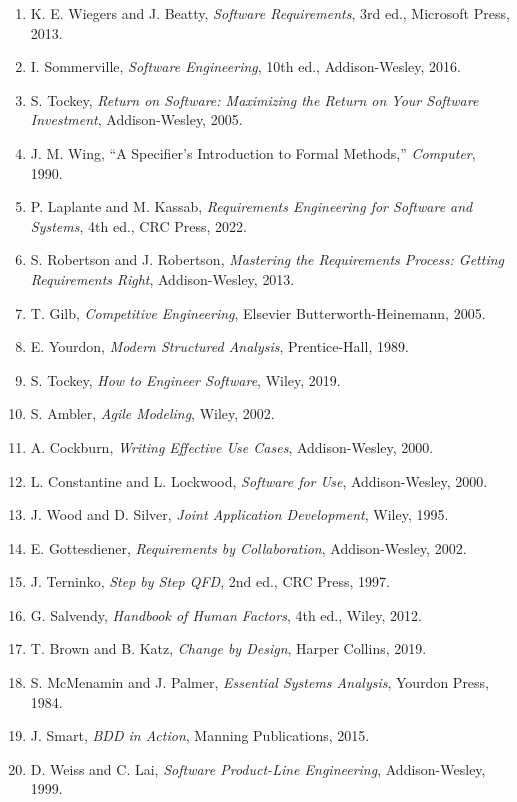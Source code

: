 \documentclass[uplatex,10pt,dvipdfmx,nomag]{jsarticle}
\begin{document}
\footnotesize
\begin{enumerate}[leftmargin=2.2em,itemsep=.15ex]
\item K. E. Wiegers and J. Beatty, \textit{Software Requirements}, 3rd ed., Microsoft Press, 2013.
\item I. Sommerville, \textit{Software Engineering}, 10th ed., Addison-Wesley, 2016.
\item S. Tockey, \textit{Return on Software: Maximizing the Return on Your Software Investment}, Addison-Wesley, 2005.
\item J. M. Wing, ``A Specifier's Introduction to Formal Methods,'' \textit{Computer}, 1990.
\item P. Laplante and M. Kassab, \textit{Requirements Engineering for Software and Systems}, 4th ed., CRC Press, 2022.
\item S. Robertson and J. Robertson, \textit{Mastering the Requirements Process: Getting Requirements Right}, Addison-Wesley, 2013.
\item T. Gilb, \textit{Competitive Engineering}, Elsevier Butterworth-Heinemann, 2005.
\item E. Yourdon, \textit{Modern Structured Analysis}, Prentice-Hall, 1989.
\item S. Tockey, \textit{How to Engineer Software}, Wiley, 2019.
\item S. Ambler, \textit{Agile Modeling}, Wiley, 2002.
\item A. Cockburn, \textit{Writing Effective Use Cases}, Addison-Wesley, 2000.
\item L. Constantine and L. Lockwood, \textit{Software for Use}, Addison-Wesley, 2000.
\item J. Wood and D. Silver, \textit{Joint Application Development}, Wiley, 1995.
\item E. Gottesdiener, \textit{Requirements by Collaboration}, Addison-Wesley, 2002.
\item J. Terninko, \textit{Step by Step QFD}, 2nd ed., CRC Press, 1997.
\item G. Salvendy, \textit{Handbook of Human Factors}, 4th ed., Wiley, 2012.
\item T. Brown and B. Katz, \textit{Change by Design}, Harper Collins, 2019.
\item S. McMenamin and J. Palmer, \textit{Essential Systems Analysis}, Yourdon Press, 1984.
\item J. Smart, \textit{BDD in Action}, Manning Publications, 2015.
\item D. Weiss and C. Lai, \textit{Software Product-Line Engineering}, Addison-Wesley, 1999.

\end{enumerate}
\end{document}
